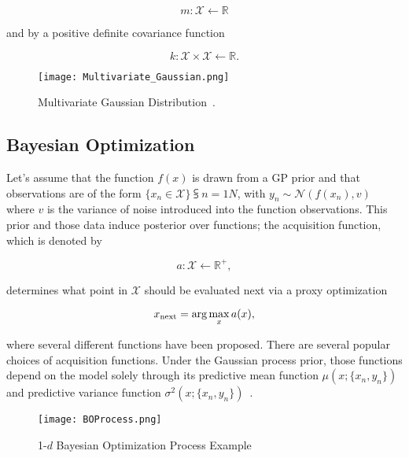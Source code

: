 \begin{equation}
	m : \mathcal{X} \leftarrow \mathbb{R}
\end{equation}

and by a positive definite covariance function 

\begin{equation}
	k : \mathcal{X} \times \mathcal{X} \leftarrow \mathbb{R}.
\end{equation}

\begin{figure} [h!]
	\centering
	\texttt{[image: Multivariate\_Gaussian.png]}
	\caption{Multivariate Gaussian Distribution~\cite{MNDWikipedia}.}
	\label{fig:Multivatiate_Gaussian}
\end{figure}

\subsection{Bayesian Optimization} Let's assume that the function $f(x)$ is drawn from a GP prior and that observations are of the form $\{x_n \in \mathcal{X}\}\subsup{}{ n=1}{N}$, with $y_n \sim \mathcal{N}(f(x_n), v)$ where $v$ is the variance of noise introduced into the function observations. This prior and those data induce  posterior over functions; the acquisition function, which is denoted by

\begin{equation}
	a : \mathcal{X} \leftarrow \mathbb{R}^+,
\end{equation}

determines what point in $\mathcal{X}$ should be evaluated next via a proxy optimization

\begin{equation}
	x\textsubscript{next} = \arg\max_{x}a(x),
\end{equation}

where several different functions have been proposed. There are several popular choices of acquisition functions. Under the Gaussian process prior, those functions depend on the model solely through its predictive mean function $\mu(x; \{x_n, y_n\})$ and predictive variance function $\sigma^2(x; \{x_n, y_n\})$~\cite{NIPS2012_4522}. 


\begin{figure} [h!]
	\centering
	\texttt{[image: BOProcess.png]}
	\caption{1-$d$ Bayesian Optimization Process Example~\cite{BayesianOptimizationImage}}
	\label{fig:BoProcess}
\end{figure}

